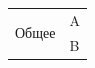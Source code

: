 \documentclass{article}
\begin{document}
\begin{tabular}{ll}\multirow{2}{*}{Общее} & A\\ & B\end{tabular}
\end{document}
